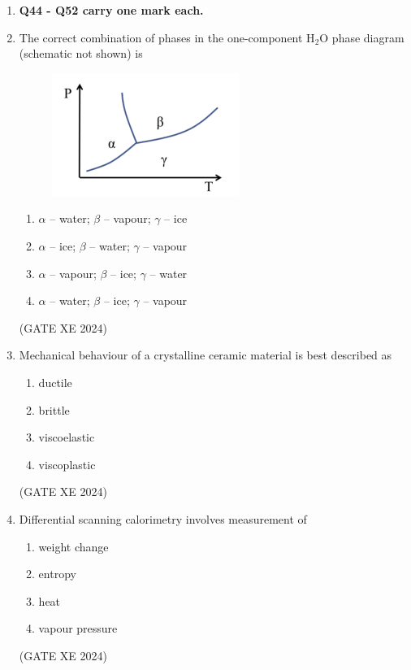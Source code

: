 \documentclass[12pt]{article}
\begin{document}
\begin{enumerate}
(GATE XE 2024)

\begin{center}
    \textbf{END OF SECTION - B}
\end{center}

\newpage

\begin{center}
    {\Large \textbf{MATERIALS SCIENCE (XE - C)}}
\end{center}

\item[] \textbf{Q44 - Q52 carry one mark each.}
\item The correct combination of phases in the one-component H$_2$O phase diagram (schematic not shown) is
\begin{figure}[H]
    \centering
    \includegraphics[width=0.5\columnwidth]{figs/ass5_c_q44.png}
    \caption{}
    \label{fig:placeholder}
\end{figure}

\begin{enumerate}
\item $\alpha$ -- water; $\beta$ -- vapour; $\gamma$ -- ice
\item $\alpha$ -- ice; $\beta$ -- water; $\gamma$ -- vapour
\item $\alpha$ -- vapour; $\beta$ -- ice; $\gamma$ -- water
\item $\alpha$ -- water; $\beta$ -- ice; $\gamma$ -- vapour
\end{enumerate}
(GATE XE 2024)

\item Mechanical behaviour of a crystalline ceramic material is best described as
\begin{enumerate}
\item ductile
\item brittle
\item viscoelastic
\item viscoplastic
\end{enumerate}
(GATE XE 2024)

\item Differential scanning calorimetry involves measurement of
\begin{enumerate}
\item weight change
\item entropy
\item heat
\item vapour pressure
\end{enumerate}
(GATE XE 2024)


\end{enumerate}
\end{document}
